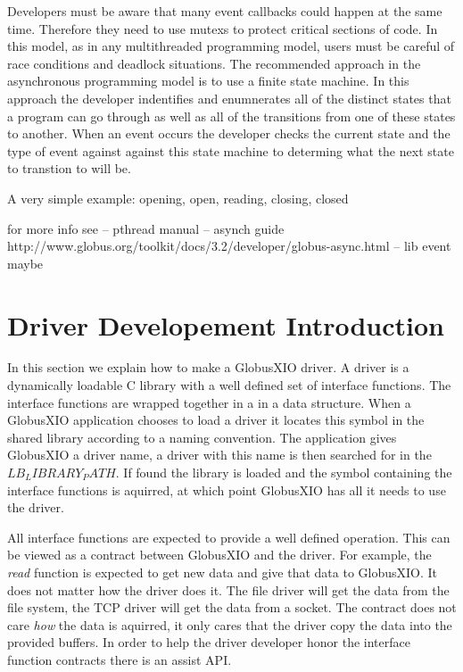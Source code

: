 \documentclass[11pt]{article}
\begin{document}
Developers must be aware that many event callbacks could happen at the same
time.  Therefore they need to use mutexs to protect critical sections
of code.  In this model, as in any multithreaded programming model,
users must be careful of race conditions and deadlock situations.
The recommended approach in the asynchronous programming model is 
to use a finite state machine.  In this approach the developer 
indentifies and enumnerates all of the distinct states that a program 
can go through as well as all of the transitions from one of these
states to another.  When an event occurs the developer checks the current
state and the type of event against against this state machine to determing
what the next state to transtion to will be.

A very simple example:  opening, open, reading, closing, closed

for more info see
-- pthread manual
-- asynch guide
    http://www.globus.org/toolkit/docs/3.2/developer/globus-async.html
-- lib event maybe


\section{Driver Developement Introduction}
In this section we explain how to make a GlobusXIO driver.  A driver is 
a dynamically loadable C library with a well defined set of interface
functions.  
The interface functions are wrapped together in a in a data structure.
When a GlobusXIO application chooses to load a driver it locates this
symbol in the shared library according to a naming convention.
The application gives GlobusXIO a driver name, a driver with this name
is then searched for in the $LB_LIBRARY_PATH$.  If found the library is
loaded and the symbol containing the interface functions is aquirred,
at which point GlobusXIO has all it needs to use the driver.

All interface functions are expected to provide a well defined operation.
This can be viewed as a contract between GlobusXIO and the driver.
For example, the \emph{read} function is expected to get new data
and give that data to GlobusXIO.  It does not matter how the driver
does it.  The file driver will get the data from the file system, the
TCP driver will get the data from a socket.  The contract does not
care \emph{how} the data is aquirred, it only cares that the driver
copy the data into the provided buffers.  In order to help the driver 
developer honor the interface function contracts
there is an assist API.  
\end{document}
